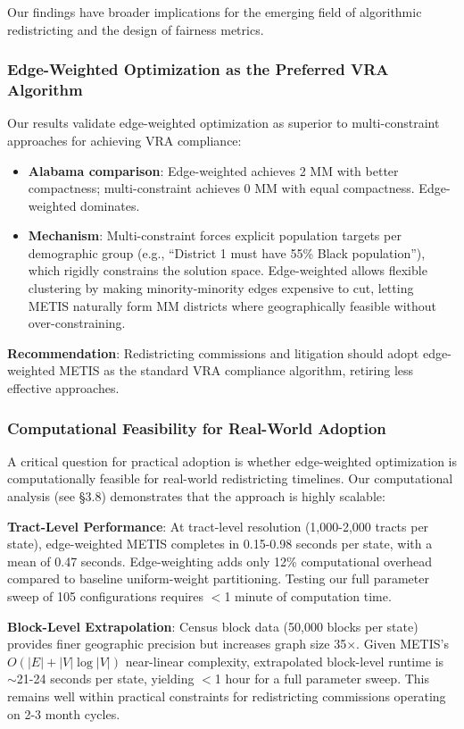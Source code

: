 Our findings have broader implications for the emerging field of algorithmic redistricting and the design of fairness metrics.

\subsubsection{Edge-Weighted Optimization as the Preferred VRA Algorithm}

Our results validate edge-weighted optimization as superior to multi-constraint approaches for achieving VRA compliance:
\begin{itemize}
    \item \textbf{Alabama comparison}: Edge-weighted achieves 2 MM with better compactness; multi-constraint achieves 0 MM with equal compactness. Edge-weighted dominates.
    \item \textbf{Mechanism}: Multi-constraint forces explicit population targets per demographic group (e.g., ``District 1 must have 55\% Black population''), which rigidly constrains the solution space. Edge-weighted allows flexible clustering by making minority-minority edges expensive to cut, letting METIS naturally form MM districts where geographically feasible without over-constraining.
\end{itemize}

\textbf{Recommendation}: Redistricting commissions and litigation should adopt edge-weighted METIS as the standard VRA compliance algorithm, retiring less effective approaches.

\subsubsection{Computational Feasibility for Real-World Adoption}

A critical question for practical adoption is whether edge-weighted optimization is computationally feasible for real-world redistricting timelines. Our computational analysis (see §3.8) demonstrates that the approach is highly scalable:

\textbf{Tract-Level Performance}: At tract-level resolution (1,000-2,000 tracts per state), edge-weighted METIS completes in 0.15-0.98 seconds per state, with a mean of 0.47 seconds. Edge-weighting adds only 12\% computational overhead compared to baseline uniform-weight partitioning. Testing our full parameter sweep of 105 configurations requires $<$1 minute of computation time.

\textbf{Block-Level Extrapolation}: Census block data (50,000 blocks per state) provides finer geographic precision but increases graph size 35$\times$. Given METIS's $O(|E| + |V|\log|V|)$ near-linear complexity, extrapolated block-level runtime is $\sim$21-24 seconds per state, yielding $<$1 hour for a full parameter sweep. This remains well within practical constraints for redistricting commissions operating on 2-3 month cycles.

